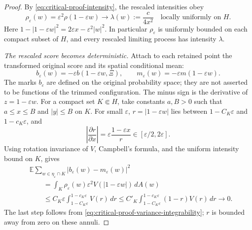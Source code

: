 \documentclass[11pt,a4paper]{article}
\numberwithin{equation}{section}
\theoremstyle{definition}
\theoremstyle{remark}
\newcommand{\E}{\mathbb E}
\begin{document}
\begin{proof}
By \eqref{eq:critical-proof-intensity}, the rescaled intensities obey
\begin{equation}\label{eq:critical-halfplane-intensity}
 \rho_\varepsilon(w)=\varepsilon^2\rho(1-\varepsilon w)
 \longrightarrow \lambda(w):=\frac{c}{4x^2}
 \quad\text{locally uniformly on }H.
\end{equation}
Here
$1-|1-\varepsilon w|^2=2\varepsilon x-\varepsilon^2|w|^2$.
In particular $\rho_\varepsilon$ is uniformly bounded on each compact
subset of $H$, and every rescaled limiting process has intensity
$\lambda$.

\emph{The rescaled score becomes deterministic.}
Attach to each retained point the transformed original score and its
spatial conditional mean:
\[
 b_\varepsilon(w)
       =-\varepsilon b(1-\varepsilon w,\Xi),\qquad
 m_\varepsilon(w)=-\varepsilon m(1-\varepsilon w).
\]
The marks $b_\varepsilon$ are defined on the original probability space;
they are not asserted to be functions of the trimmed configuration.
The minus sign is the derivative of $z=1-\varepsilon w$.
For a compact set $K\Subset H$, take constants $a,B>0$ such that
$a\le x\le B$ and $|y|\le B$ on $K$. For small $\varepsilon$,
$r=|1-\varepsilon w|$ lies between
$1-C_K\varepsilon$ and $1-c_K\varepsilon$, and
\[
 \left|\frac{\partial r}{\partial x}\right|
 =\varepsilon\frac{1-\varepsilon x}{r}
 \in[\varepsilon/2,2\varepsilon].
\]
Using rotation invariance of $V$, Campbell's formula, and the uniform
intensity bound on $K$, gives
\begin{align}
 &\E\sum_{w\in\eta_\varepsilon\cap K}
           |b_\varepsilon(w)-m_\varepsilon(w)|^2
 \nonumber\\
 &\qquad=\int_K\rho_\varepsilon(w)\varepsilon^2
                                     V(|1-\varepsilon w|)\,dA(w)
 \nonumber\\
 &\qquad\le C_K\varepsilon
           \int_{1-C_K\varepsilon}^{1-c_K\varepsilon}V(r)\,dr
 \le C'_K\int_{1-C_K\varepsilon}^{1-c_K\varepsilon}
                                      (1-r)V(r)\,dr
 \longrightarrow0.
 \label{eq:critical-score-residual-vanishes}
\end{align}
The last step follows from
\eqref{eq:critical-proof-variance-integrability}; $r$ is bounded away
from zero on these annuli.


\end{proof}
\end{document}
